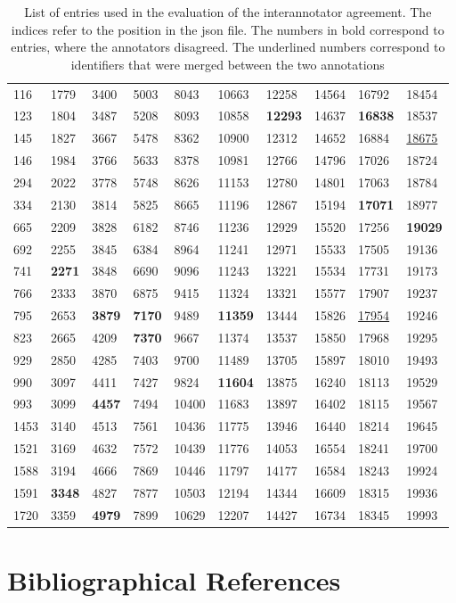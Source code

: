\documentclass[10pt, a4paper]{article}
\begin{document}
\begin{table}[!ht]
\begin{center}
\begin{tabular}{llllllllll}
\hline
116&1779&3400&5003&8043&10663&12258&14564&16792&18454\\
123&1804&3487&5208&8093&10858&\textbf{12293}&14637&\textbf{16838}&18537\\
145&1827&3667&5478&8362&10900&12312&14652&16884&\underline{18675}\\
146&1984&3766&5633&8378&10981&12766&14796&17026&18724\\
294&2022&3778&5748&8626&11153&12780&14801&17063&18784\\
334&2130&3814&5825&8665&11196&12867&15194&\textbf{17071}&18977\\
665&2209&3828&6182&8746&11236&12929&15520&17256&\textbf{19029}\\
692&2255&3845&6384&8964&11241&12971&15533&17505&19136\\
741&\textbf{2271}&3848&6690&9096&11243&13221&15534&17731&19173\\
766&2333&3870&6875&9415&11324&13321&15577&17907&19237\\
795&2653&\textbf{3879}&\textbf{7170}&9489&\textbf{11359}&13444&15826&\underline{17954}&19246\\
823&2665&4209&\textbf{7370}&9667&11374&13537&15850&17968&19295\\
929&2850&4285&7403&9700&11489&13705&15897&18010&19493\\
990&3097&4411&7427&9824&\textbf{11604}&13875&16240&18113&19529\\
993&3099&\textbf{4457}&7494&10400&11683&13897&16402&18115&19567\\
1453&3140&4513&7561&10436&11775&13946&16440&18214&19645\\
1521&3169&4632&7572&10439&11776&14053&16554&18241&19700\\
1588&3194&4666&7869&10446&11797&14177&16584&18243&19924\\
1591&\textbf{3348}&4827&7877&10503&12194&14344&16609&18315&19936\\
1720&3359&\textbf{4979}&7899&10629&12207&14427&16734&18345&19993\\
 \hline
\end{tabular}
\end{center}
\caption{List of entries used in the evaluation of the interannotator agreement. The indices refer to the position in the json file. The numbers in bold correspond to entries, where the annotators disagreed. The underlined numbers correspond to identifiers that were merged between the two annotations}
\label{ref:tab1}
\end{table}

\section{Bibliographical References}\label{reference}




\label{lr:ref}
\end{document}
